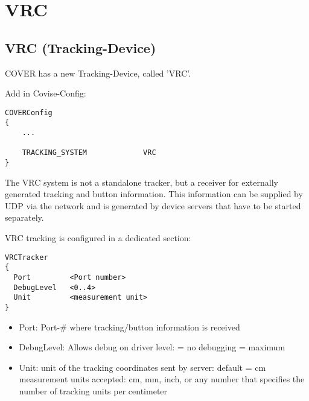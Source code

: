 \section{VRC}
\subsection{VRC (Tracking-Device)}

COVER has a new Tracking-Device, called 'VRC'.



Add in Covise-Config:


\small \begin{verbatim}
COVERConfig
{
    ...

    TRACKING_SYSTEM             VRC
}
\end{verbatim} \normalsize


The VRC system is not a standalone tracker, but a receiver for externally generated
tracking and button information. This information can be supplied by UDP via the network and is
generated by device servers that have to be started separately.

VRC tracking is configured in a dedicated section:


\small \begin{verbatim}
VRCTracker
{
  Port         <Port number>
  DebugLevel   <0..4>
  Unit         <measurement unit>
}
\end{verbatim} \normalsize


\begin{itemize}
\item Port: \newline	  
Port-\# where tracking/button information is received

\item DebugLevel:\newline 
Allows debug on driver level:  = no debugging  = maximum

\item Unit: \newline 
unit of the tracking coordinates sent by server: \newline
default = cm  \newline
measurement units accepted: \newline 
cm, mm, inch, or any number that specifies the
number of tracking units per centimeter
\end{itemize}

